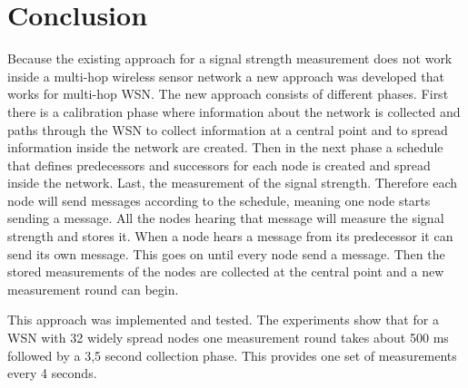 \section{Conclusion}
Because the existing approach for a signal strength measurement does not work inside a multi-hop wireless sensor network a new approach was developed that works for multi-hop WSN. The new approach consists of different phases. First there is a calibration phase where information about the network is collected and paths through the WSN to collect information at a central point and to spread information inside the network are created. Then in the next phase a schedule that defines predecessors and successors for each node is created and spread inside the network. Last, the measurement of the signal strength. Therefore each node will send messages according to the schedule, meaning one node starts sending a message. All the nodes hearing that message will measure the signal strength and stores it. When a node hears a message from its predecessor it can send its own message. This goes on until every node send a message. Then the stored measurements of the nodes are collected at the central point and a new measurement round can begin.

This approach was implemented and tested. The experiments show that for a WSN with 32 widely spread nodes one measurement round takes about 500 ms followed by a 3,5 second collection phase. This provides one set of measurements every 4 seconds. 